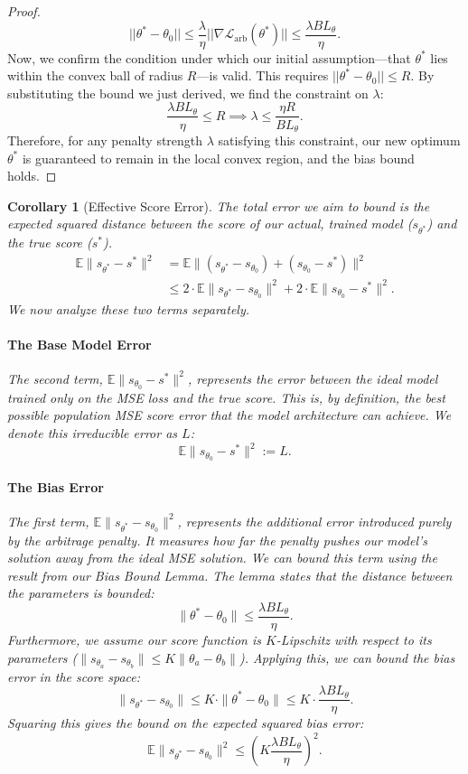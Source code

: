 \documentclass{article}
\newtheorem{corollary}[theorem]{Corollary}
\begin{document}
\begin{proof}
\[
||\theta^* - \theta_0|| \le \frac{\lambda}{\eta} ||\nabla \mathcal{L}_{\text{arb}}(\theta^*)|| \le \frac{\lambda B L_\theta}{\eta}.
\]
Now, we confirm the condition under which our initial assumption—that $\theta^*$ lies within the convex ball of radius $R$—is valid. This requires $||\theta^* - \theta_0|| \le R$. By substituting the bound we just derived, we find the constraint on $\lambda$:
\[
\frac{\lambda B L_\theta}{\eta} \le R \implies \lambda \le \frac{\eta R}{B L_\theta}.
\]
Therefore, for any penalty strength $\lambda$ satisfying this constraint, our new optimum $\theta^*$ is guaranteed to remain in the local convex region, and the bias bound holds.
\end{proof}

\begin{corollary}[Effective Score Error]
The total error we aim to bound is the expected squared distance between the score of our actual, trained model ($s_{\theta^*}$) and the true score ($s^*$).
\begin{align*}
    \mathbb{E} \|s_{\theta^*} - s^*\|^2 &= \mathbb{E} \|(s_{\theta^*} - s_{\theta_0}) + (s_{\theta_0} - s^*)\|^2 \\
    &\le 2 \cdot \mathbb{E} \|s_{\theta^*} - s_{\theta_0}\|^2 + 2 \cdot \mathbb{E} \|s_{\theta_0} - s^*\|^2.
\end{align*}
We now analyze these two terms separately.

\paragraph{The Base Model Error}
The second term, $\mathbb{E} \|s_{\theta_0} - s^*\|^2$, represents the error between the ideal model trained only on the MSE loss and the true score. This is, by definition, the best possible population MSE score error that the model architecture can achieve. We denote this irreducible error as $L$:
\[
\mathbb{E} \|s_{\theta_0} - s^*\|^2 := L.
\]

\paragraph{The Bias Error}
The first term, $\mathbb{E} \|s_{\theta^*} - s_{\theta_0}\|^2$, represents the additional error introduced purely by the arbitrage penalty. It measures how far the penalty pushes our model's solution away from the ideal MSE solution. We can bound this term using the result from our Bias Bound Lemma. The lemma states that the distance between the parameters is bounded:
\[
\|\theta^* - \theta_0\| \le \frac{\lambda B L_\theta}{\eta}.
\]
Furthermore, we assume our score function is $K$-Lipschitz with respect to its parameters ($\|s_{\theta_a} - s_{\theta_b}\| \le K \|\theta_a - \theta_b\|$). Applying this, we can bound the bias error in the score space:
\[
\|s_{\theta^*} - s_{\theta_0}\| \le K \cdot \|\theta^* - \theta_0\| \le K \cdot \frac{\lambda B L_\theta}{\eta}.
\]
Squaring this gives the bound on the expected squared bias error:
\[
\mathbb{E} \|s_{\theta^*} - s_{\theta_0}\|^2 \le \left(K \frac{\lambda B L_\theta}{\eta}\right)^2.
\]


\end{corollary}
\end{document}
